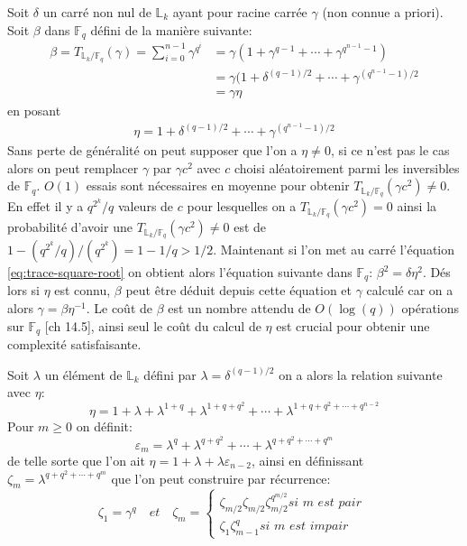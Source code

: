 \documentclass[10pt,a4paper]{book}
\theoremstyle{plain}
\theoremstyle{definition}
\theoremstyle{definition}
\theoremstyle{definition}
\theoremstyle{definition}
\theoremstyle{remark}
\theoremstyle{remark}
\begin{document}
Soit $\delta$ un carré non nul de $\mathbb{L}_k$ ayant pour racine carrée $\gamma$ (non connue a priori). Soit $\beta$ dans $\mathbb{F}_q$ défini de la manière suivante:
\begin{align}
\label{eq:trace-square-root}
\beta=T_{\mathbb{L}_k/\mathbb{F}_q}(\gamma)=\sum_{i=0}^{n-1}\gamma^{q^i}&=\gamma(1+\gamma^{q-1}+\cdots+ \gamma^{q^{n-1}-1} ) \\
&=\gamma(1+\delta^{(q-1)/2}+\cdots+ \gamma^{(q^{n-1}-1)/2} \\
&=\gamma \eta
\end{align}
en posant 
\begin{align*}
\eta=1+\delta^{(q-1)/2}+\cdots+ \gamma^{(q^{n-1}-1)/2}
\end{align*}
Sans perte de généralité on peut supposer que l'on a $\eta \neq 0$, si ce n'est pas le cas alors on peut remplacer $\gamma$ par $\gamma c^2$ avec $c$ choisi aléatoirement parmi les inversibles de $\mathbb{F}_q$.
$O(1)$ essais sont nécessaires en moyenne pour obtenir $T_{\mathbb{L}_k/\mathbb{F}_q}(\gamma c^2) \neq 0$. En effet il y a $q^{2^k}/q$ valeurs de $c$ pour lesquelles on a $T_{\mathbb{L}_k/\mathbb{F}_q}(\gamma c^2) = 0$ ainsi la probabilité d'avoir une $T_{\mathbb{L}_k/\mathbb{F}_q}(\gamma c^2) \neq 0$ est de $1-(q^{2^k}/q)/(q^{2^k})=1-1/q>1/2$.
Maintenant si l'on met au carré l'équation \ref{eq:trace-square-root} on obtient alors l'équation suivante dans $\mathbb{F}_q$: $\beta^2=\delta \eta^2$. Dés lors si $\eta$ est connu, $\beta$ peut être déduit depuis cette équation et $\gamma$ calculé car on a alors $\gamma=\beta \eta^{-1}$.
Le coût de $\beta$ est un nombre attendu de $O(\log(q))$ opérations sur $\mathbb{F}_q$ \cite{vzGJG03}[ch 14.5], ainsi seul le coût du calcul de $\eta$ est crucial pour obtenir une complexité satisfaisante.

Soit $\lambda$ un élément de $\mathbb{L}_k$ défini par $\lambda = \delta^{(q-1)/2} $ on a alors la relation suivante avec $\eta$:
\begin{equation*}
\eta = 1 + \lambda + \lambda^{1+q} + \lambda^{1+q+q^2} + \cdots + \lambda^{1+q+q^2+\cdots+q^{n-2}} 
\end{equation*}
Pour $m \geqslant 0$ on définit:
\begin{equation*}
\varepsilon_m=\lambda^{q} + \lambda^{q+q^2} + \cdots + \lambda^{q+q^2+\cdots+q^{m}}
\end{equation*} 
de telle sorte que l'on ait $\eta=1+\lambda+\lambda \varepsilon_{n-2}$, ainsi en définissant $\zeta_m=\lambda^{q+q^2+\cdots+q^{m}} $ que l'on peut construire par récurrence:
\begin{equation}
\zeta_1=\gamma^q \quad \textit{et} \quad
\zeta_m=
\begin{cases} 
\zeta_{m/2}  \zeta_{m/2}\zeta_{m/2}^{q^{m/2}} \textit{si m est pair }\\
\zeta_{1}  \zeta_{m-1}^{q} \textit{si m est impair}
\end{cases}
\end{equation}
\end{document}
